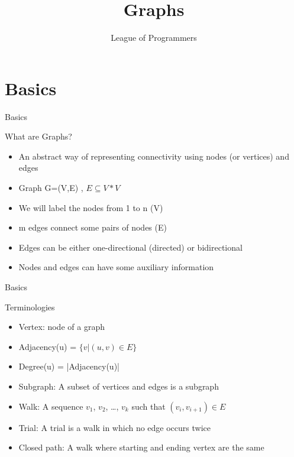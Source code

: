 \documentclass{beamer}
\title{Graphs
}
\author{League of Programmers}
\institute{ACA, IIT Kanpur}
\date
\begin{document}
\begin{frame}
  \titlepage
\end{frame}

\section{Basics}

\begin{frame}[<+->]{Basics}
\begin{block}{What are Graphs?}
  \begin{itemize}
    \item An abstract way of representing connectivity using nodes (or vertices) and edges
    \item Graph G=(V,E) , $E \subseteq V*V$
    \item We will label the nodes from 1 to n (V)
    \item m edges connect some pairs of nodes (E)
    \item Edges can be either one-directional (directed) or bidirectional
    \item Nodes and edges can have some auxiliary information
  \end{itemize}
\end{block}
\end{frame}

\begin{frame}[<+->]{Basics}
\begin{block}{Terminologies}
  \begin{itemize}
    \item Vertex: node of a graph
    \item Adjacency(u) = $\{v | (u, v) \in E\}$
    \item Degree(u) = |Adjacency(u)|
    \item Subgraph: A subset of vertices and edges is a subgraph
    \item Walk: A sequence $v_1$, $v_2$, \dots, $v_k$ such that $(v_i, v_{i+1}) \in E$
    \item Trial: A trial is a walk in which no edge occurs twice
    \item Closed path: A walk where starting and ending vertex are the same
  \end{itemize}
\end{block}
\end{frame}
\end{document}
